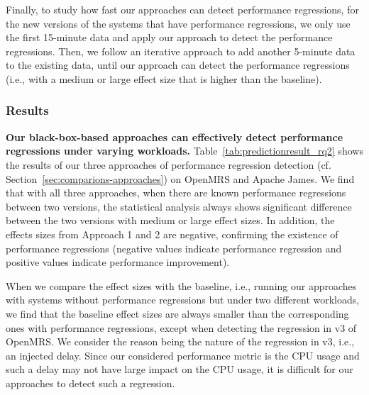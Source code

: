 Finally, to study how fast our approaches can detect performance regressions, for the new versions of the systems that have performance regressions, we only use the first 15-minute data and apply our approach to detect the performance regressions. Then, we follow an iterative approach to add another 5-minute data to the existing data, until our approach can detect the performance regressions (i.e., with a medium or large effect size that is higher than the baseline). %

\subsubsection*{Results}

\noindent\textbf{Our black-box-based approaches can effectively detect performance regressions under varying workloads.}
Table~\ref{tab:predictionresult_rq2} shows the results of our three approaches of performance regression detection (cf. Section~\ref{sec:comparions-approaches}) on OpenMRS and Apache James. We find that with all three approaches, when there are known performance regressions between two versions, the statistical analysis always shows significant difference between the two versions with medium or large effect sizes. In addition, the effects sizes from Approach 1 and 2 are negative, confirming the existence of performance regressions (negative values indicate performance regression and positive values indicate performance improvement). 

When we compare the effect sizes with the baseline, i.e., running our approaches with systems without performance regressions but under two different workloads, we find that the baseline effect sizes are always smaller than the corresponding ones with performance regressions, except when detecting the regression in v3 of OpenMRS. We consider the reason being the nature of the regression in v3, i.e., an injected delay. Since our considered performance metric is the CPU usage and such a delay may not have large impact on the CPU usage, it is difficult for our approaches to detect such a regression. 


